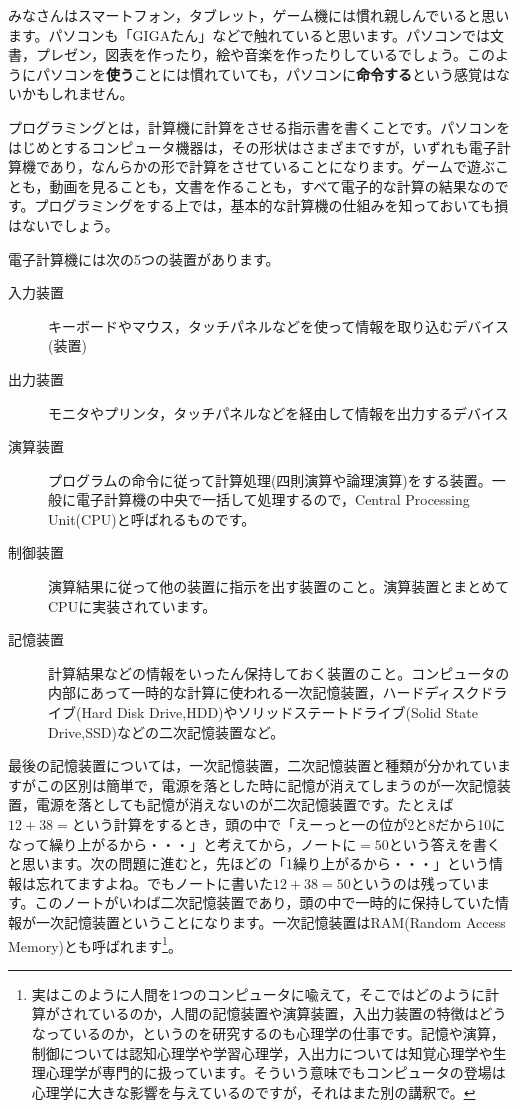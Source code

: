 \documentclass{ltjsbook}
\begin{document}
みなさんはスマートフォン，タブレット，ゲーム機には慣れ親しんでいると思います。パソコンも「GIGAたん」などで触れていると思います。パソコンでは文書，プレゼン，図表を作ったり，絵や音楽を作ったりしているでしょう。このようにパソコンを\textbf{使う}ことには慣れていても，パソコンに\textbf{命令する}という感覚はないかもしれません。

プログラミングとは，計算機に計算をさせる指示書を書くことです。パソコンをはじめとするコンピュータ機器は，その形状はさまざまですが，いずれも電子計算機であり，なんらかの形で計算をさせていることになります。ゲームで遊ぶことも，動画を見ることも，文書を作ることも，すべて電子的な計算の結果なのです。プログラミングをする上では，基本的な計算機の仕組みを知っておいても損はないでしょう。

電子計算機には次の5つの装置があります。

\begin{description}
	\item[入力装置] キーボードやマウス，タッチパネルなどを使って情報を取り込むデバイス(装置)
	\item[出力装置] モニタやプリンタ，タッチパネルなどを経由して情報を出力するデバイス
	\item[演算装置] プログラムの命令に従って計算処理(四則演算や論理演算)をする装置。一般に電子計算機の中央で一括して処理するので，Central Processing Unit(CPU)と呼ばれるものです。
	\item[制御装置] 演算結果に従って他の装置に指示を出す装置のこと。演算装置とまとめてCPUに実装されています。
	\item[記憶装置] 計算結果などの情報をいったん保持しておく装置のこと。コンピュータの内部にあって一時的な計算に使われる一次記憶装置，ハードディスクドライブ(Hard Disk Drive,HDD)やソリッドステートドライブ(Solid State Drive,SSD)などの二次記憶装置など。
\end{description}

最後の記憶装置については，一次記憶装置，二次記憶装置と種類が分かれていますがこの区別は簡単で，電源を落とした時に記憶が消えてしまうのが一次記憶装置，電源を落としても記憶が消えないのが二次記憶装置です。たとえば$12+38=$という計算をするとき，頭の中で「えーっと一の位が2と8だから10になって繰り上がるから・・・」と考えてから，ノートに$=50$という答えを書くと思います。次の問題に進むと，先ほどの「1繰り上がるから・・・」という情報は忘れてますよね。でもノートに書いた$12+38=50$というのは残っています。このノートがいわば二次記憶装置であり，頭の中で一時的に保持していた情報が一次記憶装置ということになります。一次記憶装置はRAM(Random Access Memory)とも呼ばれます\footnote{実はこのように人間を1つのコンピュータに喩えて，そこではどのように計算がされているのか，人間の記憶装置や演算装置，入出力装置の特徴はどうなっているのか，というのを研究するのも心理学の仕事です。記憶や演算，制御については認知心理学や学習心理学，入出力については知覚心理学や生理心理学が専門的に扱っています。そういう意味でもコンピュータの登場は心理学に大きな影響を与えているのですが，それはまた別の講釈で。}。
\end{document}
